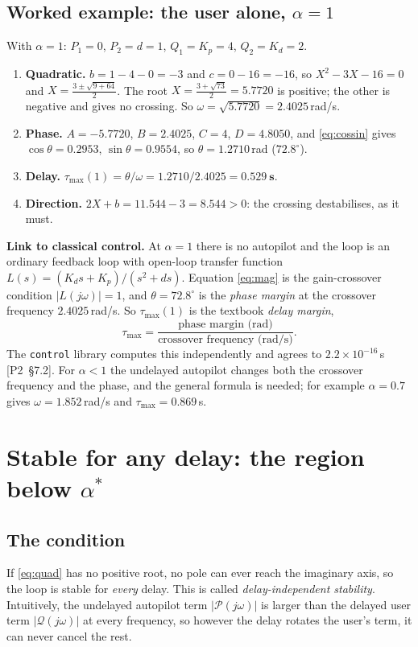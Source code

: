 \documentclass[11pt,a4paper]{article}
\newcommand{\ptwo}[1]{{\small\textsf{[P2~\S#1]}}}
\newcommand{\code}[1]{\texttt{#1}}
\theoremstyle{definition}
\begin{document}
\subsection{Worked example: the user alone, \texorpdfstring{$\alpha = 1$}{alpha = 1}}
With $\alpha = 1$: $P_1 = 0$, $P_2 = d = 1$, $Q_1 = K_p = 4$,
$Q_2 = K_d = 2$.
\begin{enumerate}\setlength{\itemsep}{2pt}
\item \textbf{Quadratic.} $b = 1 - 4 - 0 = -3$ and $c = 0 - 16 = -16$, so
$X^2 - 3X - 16 = 0$ and
$X = \tfrac{3 \pm \sqrt{9 + 64}}{2}$. The root
$X = \tfrac{3 + \sqrt{73}}{2} = 5.7720$ is positive; the other is
negative and gives no crossing. So $\omega = \sqrt{5.7720} = 2.4025$\,rad/s.
\item \textbf{Phase.} $A = -5.7720$, $B = 2.4025$, $C = 4$, $D = 4.8050$,
and \eqref{eq:cossin} gives $\cos\theta = 0.2953$,
$\sin\theta = 0.9554$, so $\theta = 1.2710$\,rad ($72.8^\circ$).
\item \textbf{Delay.}
$\tau_{\max}(1) = \theta/\omega = 1.2710/2.4025 = \mathbf{0.529\ s}$.
\item \textbf{Direction.} $2X + b = 11.544 - 3 = 8.544 > 0$: the crossing
destabilises, as it must.
\end{enumerate}

\textbf{Link to classical control.} At $\alpha = 1$ there is no
autopilot and the loop is an ordinary feedback loop with open-loop
transfer function $L(s) = (K_d s + K_p)/(s^2 + d s)$. Equation
\eqref{eq:mag} is the gain-crossover condition $|L(j\omega)| = 1$, and
$\theta = 72.8^\circ$ is the \emph{phase margin} at the crossover
frequency $2.4025$\,rad/s. So $\tau_{\max}(1)$ is the textbook
\emph{delay margin},
\[
\tau_{\max} = \frac{\text{phase margin (rad)}}{\text{crossover frequency (rad/s)}} .
\]
The \code{control} library computes this independently and agrees to
$2.2 \times 10^{-16}$\,s \ptwo{7.2}. For $\alpha < 1$ the undelayed
autopilot changes both the crossover frequency and the phase, and the
general formula is needed; for example $\alpha = 0.7$ gives
$\omega = 1.852$\,rad/s and $\tau_{\max} = 0.869$\,s.

\section{Stable for any delay: the region below \texorpdfstring{$\alpha^{*}$}{alpha*}}
\label{sec:alphastar}

\subsection{The condition}
If \eqref{eq:quad} has no positive root, no pole can ever reach the
imaginary axis, so the loop is stable for \emph{every} delay. This is
called \emph{delay-independent stability}. Intuitively, the undelayed
autopilot term $|\mathcal{P}(j\omega)|$ is larger than the delayed user
term $|\mathcal{Q}(j\omega)|$ at every frequency, so however the delay
rotates the user's term, it can never cancel the rest.
\end{document}
